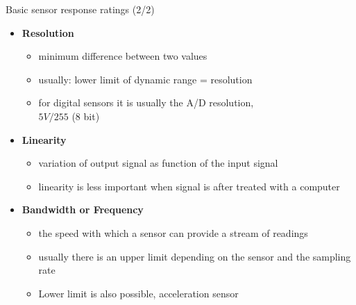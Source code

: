 \documentclass[compress]{beamer}
\begin{document}

\begin{frame}{Basic sensor response ratings (2/2)}

    \begin{itemize}
        \item {\bf Resolution}
              \begin{itemize}
                  \item minimum difference between two values
                  \item usually: lower limit of dynamic range = resolution
                  \item for digital sensors it is usually the A/D resolution,\\ \eg $ 5V / 255 $ (8 bit)

              \end{itemize}

        \item {\bf Linearity}

              \begin{itemize}
                  \item
                        variation of output signal as function of the input signal
                  \item
                        linearity is less important when signal is after treated with a
                        computer
              \end{itemize}

        \item {\bf Bandwidth or Frequency}

              \begin{itemize}
                  \item the speed with which a sensor can provide a stream of readings
                  \item usually there is an upper limit depending on the sensor and the
                        sampling rate
                  \item Lower limit is also possible, \eg acceleration sensor
              \end{itemize}

    \end{itemize}
\end{frame}
\end{document}
